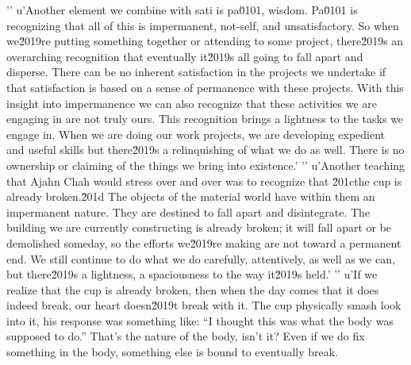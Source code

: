 '\n'
u'Another element we combine with sati is pa\u0101, wisdom. Pa\u0101 is recognizing that all of this is impermanent, not-self, and unsatisfactory. So when we\u2019re putting something together or attending to some project, there\u2019s an overarching recognition that eventually it\u2019s all going to fall apart and disperse. There can be no inherent satisfaction in the projects we undertake if that satisfaction is based on a sense of permanence with these projects. With this insight into impermanence we can also recognize that these activities we are engaging in are not truly ours. This recognition brings a lightness to the tasks we engage in. When we are doing our work projects, we are developing expedient and useful skills but there\u2019s a relinquishing of what we do as well. There is no ownership or claiming of the things we bring into existence.'
'\n'
u'Another teaching that Ajahn Chah would stress over and over was to recognize that \u201cthe cup is already broken.\u201d The objects of the material world have within them an impermanent nature. They are destined to fall apart and disintegrate. The building we are currently constructing is already broken; it will fall apart or be demolished someday, so the efforts we\u2019re making are not toward a permanent end. We still continue to do what we do carefully, attentively, as well as we can, but there\u2019s a lightness, a spaciousness to the way it\u2019s held.'
'\n'
u'If we realize that the cup is already broken, then when the day comes that it does indeed break, our heart doesn\u2019t break with it. The cup physically smash
look into it, his response was something like: ``I thought this was 
what the body was supposed to do.'' That's the nature of the body, 
isn't it? Even if we do fix something in the body, something else is 
bound to eventually break.

